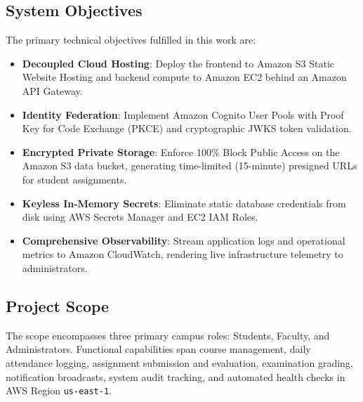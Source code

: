 \subsection{System Objectives}
The primary technical objectives fulfilled in this work are:
\begin{itemize}[leftmargin=*,itemsep=2pt]
    \item \textbf{Decoupled Cloud Hosting}: Deploy the frontend to Amazon S3 Static Website Hosting and backend compute to Amazon EC2 behind an Amazon API Gateway.
    \item \textbf{Identity Federation}: Implement Amazon Cognito User Pools with Proof Key for Code Exchange (PKCE) and cryptographic JWKS token validation.
    \item \textbf{Encrypted Private Storage}: Enforce 100\% Block Public Access on the Amazon S3 data bucket, generating time-limited (15-minute) presigned URLs for student assignments.
    \item \textbf{Keyless In-Memory Secrets}: Eliminate static database credentials from disk using AWS Secrets Manager and EC2 IAM Roles.
    \item \textbf{Comprehensive Observability}: Stream application logs and operational metrics to Amazon CloudWatch, rendering live infrastructure telemetry to administrators.
\end{itemize}

\subsection{Project Scope}
The scope encompasses three primary campus roles: Students, Faculty, and Administrators. Functional capabilities span course management, daily attendance logging, assignment submission and evaluation, examination grading, notification broadcasts, system audit tracking, and automated health checks in AWS Region \texttt{us-east-1}.

